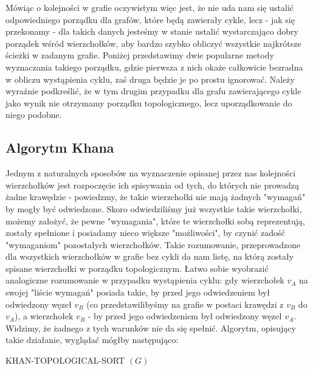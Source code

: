 Mówiąc o kolejności w grafie oczywistym więc jest, że nie uda nam się ustalić odpowiedniego porządku dla grafów, które będą zawierały cykle, lecz - jak się przekonamy - dla takich danych jesteśmy w stanie ustalić wystarczająco dobry porządek wśród wierzchołków, aby bardzo szybko obliczyć wszystkie najkrótsze ścieżki w zadanym grafie. Poniżej przedstawimy dwie popularne metody wyznaczania takiego porządku, gdzie pierwsza z nich okaże całkowicie bezradna w obliczu wystąpienia cyklu, zaś druga będzie je po prostu ignorować. Należy wyraźnie podkreślić, że w tym drugim przypadku dla grafu zawierającego cykle jako wynik nie otrzymamy porządku topologicznego, lecz uporządkowanie do niego podobne.

\subsection{Algorytm Khana}

Jednym z naturalnych sposobów na wyznaczenie opisanej przez nas kolejności wierzchołków jest rozpoczęcie ich spisywania od tych, do których nie prowadzą żadne krawędzie - powiedzmy, że takie wierzchołki nie mają żadnych "wymagań" by mogły być odwiedzone. Skoro odwiedziliśmy już wszystkie takie wierzchołki, możemy założyć, że pewne "wymagania", które te wierzchołki sobą reprezentują, zostały spełnione i posiadamy nieco większe "możliwości", by czynić zadość "wymaganiom" pozostałych wierzchołków. Takie rozumowanie, przeprowadzone dla wszystkich wierzchołków w grafie bez cykli da nam listę, na którą zostały spisane wierzchołki w porządku topologicznym. Łatwo sobie wyobrazić analogiczne rozumowanie w przypadku wystąpienia cyklu: gdy wierzchołek $v_{A}$ na swojej "liście wymagań" posiada takie, by przed jego odwiedzeniem był odwiedzony węzeł $v_{B}$ (co przedstawilibyśmy na grafie w postaci krawędzi z $v_{B}$ do $v_{A}$), a wierzchołek $v_{B}$ - by przed jego odwiedzeniem był odwiedzony węzeł $v_{A}$. Widzimy, że żadnego z tych warunków nie da się spełnić. Algorytm, opisujący takie działanie, wyglądać mógłby następująco:

\begin{algorithm}[!htbp]
\DontPrintSemicolon
{}
\caption{ KHAN-TOPOLOGICAL-SORT $\left( G \right)$\label{alg:KhanTopologicalSort}}
\end{algorithm}

